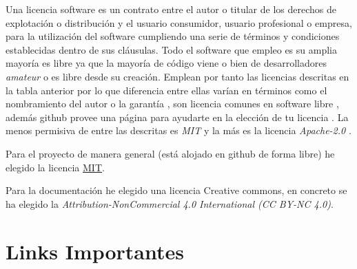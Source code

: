Una licencia software es un contrato entre el autor o titular de los derechos de explotación o distribución y el usuario consumidor, usuario profesional o empresa, para la utilización del software cumpliendo una serie de términos y condiciones establecidas dentro de sus cláusulas. Todo el software que empleo es su amplia mayoría es libre ya que la mayoría de código viene o bien de desarrolladores \emph{amateur} o es libre desde su creación. Emplean por tanto las licencias descritas en la tabla anterior por lo que diferencia entre ellas varían en términos como el nombramiento del autor o la garantía , son licencia comunes en software libre \cite{githublicense} , además github provee una página para ayudarte en la elección de tu licencia \citep{githubchoose}. La menos permisiva de entre las descritas es \emph{MIT} \citep{mit}  y la más es la licencia \emph{Apache-2.0} \cite{apache}.


Para el proyecto de manera general (está alojado en github de forma libre) he elegido la licencia  \href{https://github.com/aguadotzn/TFM_MUINBDES/blob/master/LICENSE}{MIT}.

Para la documentación he elegido una licencia Creative commons, en concreto se ha elegido la \emph{Attribution-NonCommercial 4.0 International (CC BY-NC 4.0)}.

\label{commons}


\section{Links Importantes}\label{links_final}



